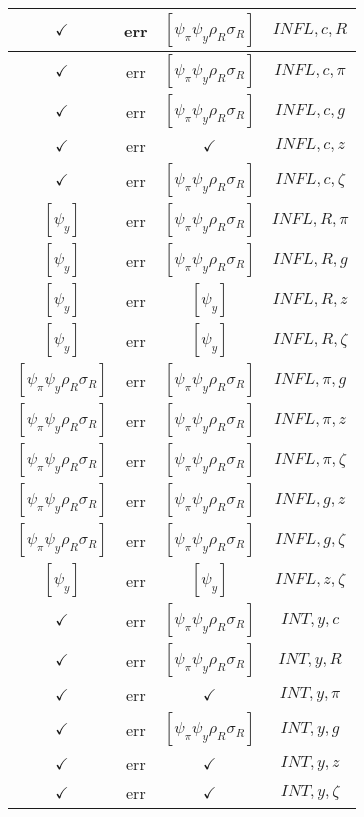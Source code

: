 \documentclass[a4paper,10pt]{article}
\begin{document}
\begin{longtable}{|c|c|c|c|}
\hline
$\checkmark$ & err & $[\psi_\pi \psi_y \rho_R \sigma_R ]$ & ${INFL},{c},{R}$ \\
\hline
$\checkmark$ & err & $[\psi_\pi \psi_y \rho_R \sigma_R ]$ & ${INFL},{c},{\pi}$ \\
\hline
$\checkmark$ & err & $[\psi_\pi \psi_y \rho_R \sigma_R ]$ & ${INFL},{c},{g}$ \\
\hline
$\checkmark$ & err & $\checkmark$ & ${INFL},{c},{z}$ \\
\hline
$\checkmark$ & err & $[\psi_\pi \psi_y \rho_R \sigma_R ]$ & ${INFL},{c},{\zeta}$ \\
\hline
$[\psi_y ]$ & err & $[\psi_\pi \psi_y \rho_R \sigma_R ]$ & ${INFL},{R},{\pi}$ \\
\hline
$[\psi_y ]$ & err & $[\psi_\pi \psi_y \rho_R \sigma_R ]$ & ${INFL},{R},{g}$ \\
\hline
$[\psi_y ]$ & err & $[\psi_y ]$ & ${INFL},{R},{z}$ \\
\hline
$[\psi_y ]$ & err & $[\psi_y ]$ & ${INFL},{R},{\zeta}$ \\
\hline
$[\psi_\pi \psi_y \rho_R \sigma_R ]$ & err & $[\psi_\pi \psi_y \rho_R \sigma_R ]$ & ${INFL},{\pi},{g}$ \\
\hline
$[\psi_\pi \psi_y \rho_R \sigma_R ]$ & err & $[\psi_\pi \psi_y \rho_R \sigma_R ]$ & ${INFL},{\pi},{z}$ \\
\hline
$[\psi_\pi \psi_y \rho_R \sigma_R ]$ & err & $[\psi_\pi \psi_y \rho_R \sigma_R ]$ & ${INFL},{\pi},{\zeta}$ \\
\hline
$[\psi_\pi \psi_y \rho_R \sigma_R ]$ & err & $[\psi_\pi \psi_y \rho_R \sigma_R ]$ & ${INFL},{g},{z}$ \\
\hline
$[\psi_\pi \psi_y \rho_R \sigma_R ]$ & err & $[\psi_\pi \psi_y \rho_R \sigma_R ]$ & ${INFL},{g},{\zeta}$ \\
\hline
$[\psi_y ]$ & err & $[\psi_y ]$ & ${INFL},{z},{\zeta}$ \\
\hline
$\checkmark$ & err & $[\psi_\pi \psi_y \rho_R \sigma_R ]$ & ${INT},{y},{c}$ \\
\hline
$\checkmark$ & err & $[\psi_\pi \psi_y \rho_R \sigma_R ]$ & ${INT},{y},{R}$ \\
\hline
$\checkmark$ & err & $\checkmark$ & ${INT},{y},{\pi}$ \\
\hline
$\checkmark$ & err & $[\psi_\pi \psi_y \rho_R \sigma_R ]$ & ${INT},{y},{g}$ \\
\hline
$\checkmark$ & err & $\checkmark$ & ${INT},{y},{z}$ \\
\hline
$\checkmark$ & err & $\checkmark$ & ${INT},{y},{\zeta}$ \\

\end{longtable}
\end{document}
